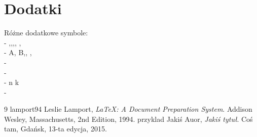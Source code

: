 \documentclass{article}
\begin{document}
\section{Dodatki}\label{sec:dodatki}
Różne dodatkowe symbole: \\
-  \alpha,\beta,\gamma,\delta, \phi, \omega \\
-  A, B,\Gamma, \Delta, \Omega \\
-  \pm \\
-  \infty \\
-  {n \choose k}\ \\
- \Updownarrow






\begin{thebibliography}
{9}
\bibitem
{lamport94}
Leslie Lamport,
\emph{\LaTeX: A Document Preparation System}.
Addison Wesley, Massachusetts,
2nd Edition,
1994.
\bibitem
{przyklad}
Jakiś Auor,
\emph{Jakiś tytuł}.
Coś tam, Gdańsk,
13-ta edycja,
2015.
\end{thebibliography}
\end{document}
